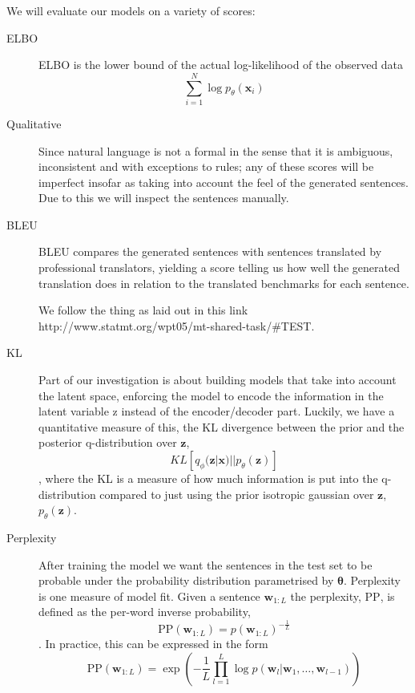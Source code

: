 We will evaluate our models on a variety of scores:

\begin{description}
\item[ELBO] ELBO is the lower bound of the actual log-likelihood of the observed
  data
  \begin{equation*}
    \sum_{i=1}^{N} \log p_{\theta}(\bm{x}_i)
  \end{equation*}
\item[Qualitative] Since natural language is not a formal in the sense that it
  is ambiguous, inconsistent and with exceptions to rules; any of these scores
  will be imperfect insofar as taking into account the feel of the generated
  sentences. Due to this we will inspect the sentences manually.
\item[BLEU] BLEU compares the generated sentences with sentences translated by
  professional translators, yielding a score telling us how well the generated
  translation does in relation to the translated benchmarks for each sentence.

  We follow the thing as laid out in this link http://www.statmt.org/wpt05/mt-shared-task/\#TEST.
\item[KL] Part of our investigation is about building models that take into
  account the latent space, enforcing the model to encode the information in the
  latent variable z instead of the encoder/decoder part. Luckily, we have a
  quantitative measure of this, the KL divergence between the prior and the
  posterior q-distribution over $\bm{z}$,
  \begin{equation*}
    KL[q_{\phi}(\bm{z} | \bm{x}) || p_{\theta}(\bm{z})]
  \end{equation*}
  , where the KL is a measure of how much information is put into the
  q-distribution compared to just using the prior isotropic gaussian over
  $\bm{z}$, $p_{\theta}(\bm{z})$.
\item[Perplexity] After training the model we want the sentences in the test set
  to be probable under the probability distribution parametrised by
  $\bm{\theta}$. Perplexity is one measure of model fit. Given a sentence
  $\bm{w}_{1:L}$ the perplexity, $\text{PP}$, is defined as the per-word inverse
  probability,
  \begin{equation}
    \label{eq:perplexity}
    \text{PP}(\bm{w}_{1:L}) = p(\bm{w}_{1:L})^{-\frac{1}{L}}
  \end{equation}.
  In practice, this can be expressed in the form
  \begin{equation}
    \label{eq:perplexity_log_form}
    \text{PP}(\bm{w}_{1:L}) = \exp(-\frac{1}{L}\prod_{l=1}^L \log p(\bm{w}_l | \bm{w}_1, \dots, \bm{w}_{l-1}))
  \end{equation}
\end{description}

